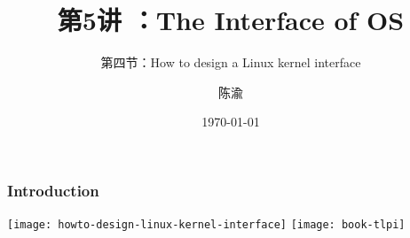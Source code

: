 


\title[第5讲]{第5讲 ：The Interface of OS} %
\subtitle{第四节：How to design a Linux kernel interface}
\author{陈渝} %
\date{\today} %




\begin{frame}
\titlepage %
\end{frame}

%
%
\begin{frame}[plain]
	\frametitle{Introduction}
	
	
	

			\centering
			\texttt{[image: howto-design-linux-kernel-interface]}
			\texttt{[image: book-tlpi]}

	
\end{frame}



